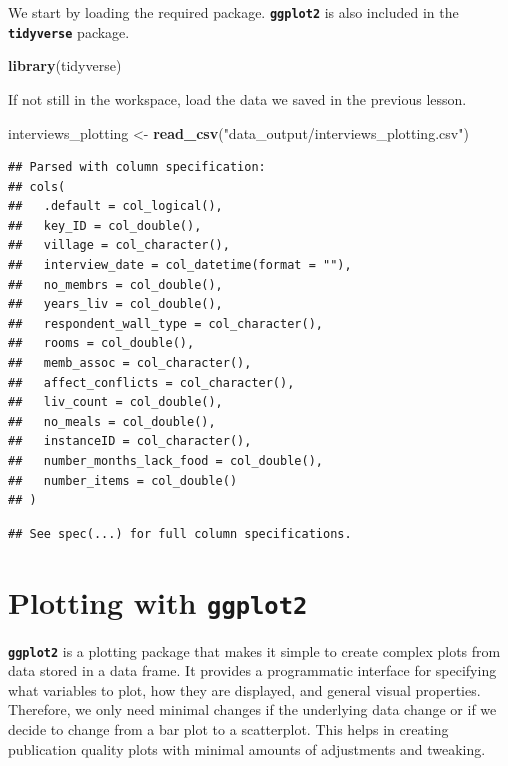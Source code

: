 \documentclass[]{book}
\newenvironment{Shaded}{\begin{snugshade}}{\end{snugshade}}
\newcommand{\KeywordTok}[1]{\textcolor[rgb]{0.13,0.29,0.53}{\textbf{#1}}}
\newcommand{\StringTok}[1]{\textcolor[rgb]{0.31,0.60,0.02}{#1}}
\newcommand{\NormalTok}[1]{#1}
\begin{document}
We start by loading the required package. \textbf{\texttt{ggplot2}} is
also included in the \textbf{\texttt{tidyverse}} package.

\begin{Shaded}
\begin{Highlighting}[]
\KeywordTok{library}\NormalTok{(tidyverse)}
\end{Highlighting}
\end{Shaded}

If not still in the workspace, load the data we saved in the previous
lesson.

\begin{Shaded}
\begin{Highlighting}[]
\NormalTok{interviews_plotting <-}\StringTok{ }\KeywordTok{read_csv}\NormalTok{(}\StringTok{"data_output/interviews_plotting.csv"}\NormalTok{)}
\end{Highlighting}
\end{Shaded}

\begin{verbatim}
## Parsed with column specification:
## cols(
##   .default = col_logical(),
##   key_ID = col_double(),
##   village = col_character(),
##   interview_date = col_datetime(format = ""),
##   no_membrs = col_double(),
##   years_liv = col_double(),
##   respondent_wall_type = col_character(),
##   rooms = col_double(),
##   memb_assoc = col_character(),
##   affect_conflicts = col_character(),
##   liv_count = col_double(),
##   no_meals = col_double(),
##   instanceID = col_character(),
##   number_months_lack_food = col_double(),
##   number_items = col_double()
## )
\end{verbatim}

\begin{verbatim}
## See spec(...) for full column specifications.
\end{verbatim}

\section{\texorpdfstring{Plotting with
\textbf{\texttt{ggplot2}}}{Plotting with ggplot2}}\label{plotting-with-ggplot2}

\textbf{\texttt{ggplot2}} is a plotting package that makes it simple to
create complex plots from data stored in a data frame. It provides a
programmatic interface for specifying what variables to plot, how they
are displayed, and general visual properties. Therefore, we only need
minimal changes if the underlying data change or if we decide to change
from a bar plot to a scatterplot. This helps in creating publication
quality plots with minimal amounts of adjustments and tweaking.
\end{document}
